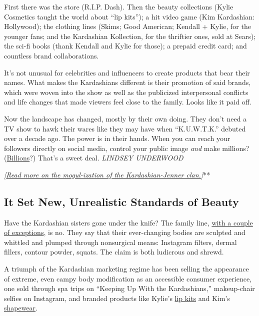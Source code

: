 First there was the store (R.I.P. Dash). Then the beauty collections
(Kylie Cosmetics taught the world about ``lip kits''); a hit video game
(Kim Kardashian: Hollywood); the clothing lines (Skims; Good American;
Kendall + Kylie, for the younger fans; and the Kardashian Kollection,
for the thriftier ones, sold at Sears); the sci-fi books (thank Kendall
and Kylie for those); a prepaid credit card; and countless brand
collaborations.

It's not unusual for celebrities and influencers to create products that
bear their names. What makes the Kardashians different is their
promotion of said brands, which were woven into the show as well as the
publicized interpersonal conflicts and life changes that made viewers
feel close to the family. Looks like it paid off.

Now the landscape has changed, mostly by their own doing. They don't
need a TV show to hawk their wares like they may have when
``K.U.W.T.K.'' debuted over a decade ago. The power is in their hands.
When you can reach your followers directly on social media, control your
public image \emph{and} make millions?
(\href{https://www.forbes.com/sites/chasewithorn/2020/05/29/inside-kylie-jennerss-web-of-lies-and-why-shes-no-longer-a-billionaire/\#5ee6a92725f7}{Billions}?)
That's a sweet deal. \emph{LINDSEY UNDERWOOD}

\emph{\emph{\emph{{[}}\href{https://www.nytimes3xbfgragh.onion/2019/03/30/style/kardashians-interview.html}{\emph{Read
more on the mogul-ization of the Kardashian-Jenner clan.}}}{]}}**

\hypertarget{it-set-new-unrealistic-standards-of-beauty}{%
\subsection{It Set New, Unrealistic Standards of
Beauty}\label{it-set-new-unrealistic-standards-of-beauty}}

Have the Kardashian sisters gone under the knife? The family line,
\href{https://www.harpersbazaar.com.au/beauty/kardashian-surgery-17663}{with
a couple of exceptions}, is no. They say that their ever-changing bodies
are sculpted and whittled and plumped through nonsurgical means:
Instagram filters, dermal fillers, contour powder, squats. The claim is
both ludicrous and shrewd.

A triumph of the Kardashian marketing regime has been selling the
appearance of extreme, even campy body modification as an accessible
consumer experience, one sold through spa trips on ``Keeping Up With the
Kardashians,'' makeup-chair selfies on Instagram, and branded products
like Kylie's
\href{https://www.nytimes3xbfgragh.onion/2019/11/19/style/kylie-jenner-coty-cosmetics.html}{lip
kits} and Kim's
\href{https://www.nytimes3xbfgragh.onion/2020/02/06/style/kim-kardashian-has-learned-restraint.html}{shapewear}.

